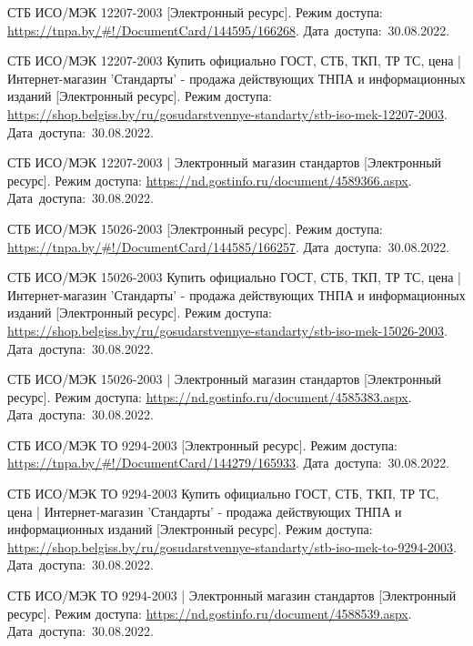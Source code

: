 \begin{thebibliography}{}
  
  
    СТБ ИСО/МЭК 12207-2003
    [Электронный ресурс].
    Режим доступа: \url{https://tnpa.by/#!/DocumentCard/144595/166268}.
    Дата~доступа:~30.08.2022.
  
    СТБ ИСО/МЭК 12207-2003 Купить официально ГОСТ, СТБ, ТКП, ТР ТС, цена | Интернет-магазин 'Стандарты' - продажа действующих ТНПА и информационных изданий
    [Электронный ресурс].
    Режим доступа: \url{https://shop.belgiss.by/ru/gosudarstvennye-standarty/stb-iso-mek-12207-2003}.
    Дата~доступа:~30.08.2022.
  
    СТБ ИСО/МЭК 12207-2003 | Электронный магазин стандартов
    [Электронный ресурс].
    Режим доступа: \url{https://nd.gostinfo.ru/document/4589366.aspx}.
    Дата~доступа:~30.08.2022.
  
  
  
    СТБ ИСО/МЭК 15026-2003
    [Электронный ресурс].
    Режим доступа: \url{https://tnpa.by/#!/DocumentCard/144585/166257}.
    Дата~доступа:~30.08.2022.
  
    СТБ ИСО/МЭК 15026-2003 Купить официально ГОСТ, СТБ, ТКП, ТР ТС, цена | Интернет-магазин 'Стандарты' - продажа действующих ТНПА и информационных изданий
    [Электронный ресурс].
    Режим доступа: \url{https://shop.belgiss.by/ru/gosudarstvennye-standarty/stb-iso-mek-15026-2003}.
    Дата~доступа:~30.08.2022.
  
    СТБ ИСО/МЭК 15026-2003 | Электронный магазин стандартов
    [Электронный ресурс].
    Режим доступа: \url{https://nd.gostinfo.ru/document/4585383.aspx}.
    Дата~доступа:~30.08.2022.
  
  
  
    СТБ ИСО/МЭК ТО 9294-2003
    [Электронный ресурс].
    Режим доступа: \url{https://tnpa.by/#!/DocumentCard/144279/165933}.
    Дата~доступа:~30.08.2022.
  
    СТБ ИСО/МЭК ТО 9294-2003 Купить официально ГОСТ, СТБ, ТКП, ТР ТС, цена | Интернет-магазин 'Стандарты' - продажа действующих ТНПА и информационных изданий
    [Электронный ресурс].
    Режим доступа: \url{https://shop.belgiss.by/ru/gosudarstvennye-standarty/stb-iso-mek-to-9294-2003}.
    Дата~доступа:~30.08.2022.
  
    СТБ ИСО/МЭК ТО 9294-2003 | Электронный магазин стандартов
    [Электронный ресурс].
    Режим доступа: \url{https://nd.gostinfo.ru/document/4588539.aspx}.
    Дата~доступа:~30.08.2022.
  

\end{thebibliography}
